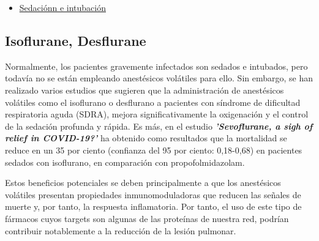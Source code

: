 \begin{itemize}
    \item \underline{Sedaciónn e intubación}
\end{itemize}

\subsection{Isoflurane, Desflurane}

Normalmente, los pacientes gravemente infectados son sedados e intubados, pero todavía no se están empleando anestésicos volátiles para ello. Sin embargo, se han realizado varios estudios que sugieren que la administración de anestésicos volátiles como el isoflurano o desflurano a pacientes con síndrome de dificultad respiratoria aguda (SDRA), mejora significativamente la oxigenación y el control de la sedación profunda y rápida. Es más, en el estudio \textbf{\textit{'Sevoflurane, a sigh of relief in COVID-19?'}} ha obtenido como resultados que la mortalidad se reduce en un 35 por ciento (confianza del 95 por ciento: 0,18-0,68) en pacientes sedados con isoflurano, en comparación con propofolmidazolam. 

Estos beneficios potenciales se deben principalmente a que los anestésicos volátiles presentan propiedades inmunomoduladoras que reducen las señales de muerte y, por tanto, la respuesta inflamatoria.  Por tanto, el uso de este tipo de fármacos cuyos targets son algunas de las proteínas de nuestra red, podrían contribuir notablemente a la reducción de la lesión pulmonar.


